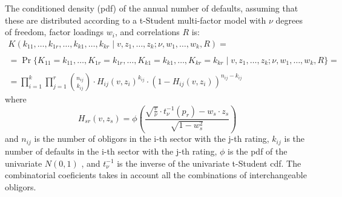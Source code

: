 \documentclass[11pt,fleqn]{book} %
\begin{document}
\begin{proposition}
	The conditioned density (pdf) of the annual number of defaults, assuming 
	that these are distributed according to a t-Student multi-factor model
	with $\nu$ degrees of freedom, factor loadings $w_i$, and correlations
	$R$ is:
	\begin{displaymath}
		\begin{array}{l}
			K(k_{11},\dots,k_{1r},\dots,k_{k1},\dots,k_{kr} \mid v,z_1,\dots,z_k; \nu, w_1,\dots,w_k, R) =                                   \\
			                                                                                                                                 \\
			= \Pr\{K_{11}=k_{11},\dots,K_{1r}=k_{1r},\dots,K_{k1}=k_{k1},\dots,K_{kr}=k_{kr} \mid v,z_1,\dots,z_k; \nu, w_1,\dots,w_k, R\} = \\
			                                                                                                                                 \\
			= \displaystyle \prod_{i=1}^k \prod_{j=1}^r \binom{n_{ij}}{k_{ij}} \cdot
			H_{ij}(v,z_i)^{k_{ij}} \cdot
			\left( 1 - H_{ij}(v,z_i) \right)^{n_{ij}-k_{ij}}
		\end{array}
	\end{displaymath}
	where
	\begin{displaymath}
		H_{sr}(v,z_s) = \phi\left(  
		\frac{\sqrt{\frac{v}{\nu}} \cdot t_{\nu}^{-1}(p_r) - w_s\cdot z_s}{\sqrt{1-w_s^2}}
		\right)
	\end{displaymath}
	and $n_{ij}$ is the number of obligors in the i-th sector with the 
	j-th rating, $k_{ij}$ is the number of defaults in the i-th sector 
	with the j-th rating, $\phi$ is the pdf of the univariate $N(0,1)$
	, and $t_{\nu}^{-1}$ is the inverse of the univariate t-Student cdf. 
	The combinatorial coeficients takes in account all the combinations 
	of interchangeable obligors.
\end{proposition}
\end{document}
